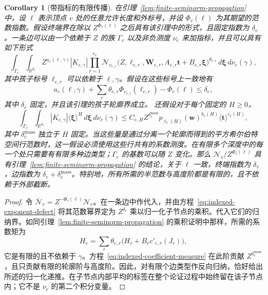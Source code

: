 \documentclass[11pt,a4paper]{article}
\numberwithin{equation}{section}
\numberwithin{figure}{section}
\newtheorem{corollary}[theorem]{Corollary}
\theoremstyle{definition}
\theoremstyle{remark}
\begin{document}
\begin{corollary}[带指标的有限传播]
\label{cor:indexed-seminorm-propagation}
在引理~\ref{lem:finite-seminorm-propagation} 中，设
$\boldsymbol\ell$ 表示顶点 $v$ 处的任意允许长度和外标号，并设 $\Phi_v(\boldsymbol\ell)$ 为其期望的范数指数。假设终端界在除以 $Z^{\Phi_v(\boldsymbol\ell)}$ 之后具有该引理中的形式，且固定指数为 $\delta_v$。一条边可以由一个依赖于 $Z$ 的族 $\Gamma_e$ 以及非负测度 $\nu_e$ 来加指标，并且可以具有如下形式
\[
 \int_{\Gamma_e}\int_{\mathbb R^{d_e}}
 Z^{a_e(\boldsymbol\ell,\gamma)}|K_{e,\gamma}|
 \prod_{r=1}^{r_e}\mathcal N_{v_{e,r}}
  \bigl(Z,\boldsymbol\ell_{e,r},\boldsymbol W_{e,r},
        A_{e,r}\boldsymbol t+B_{e,r}\boldsymbol\xi\bigr)^{\theta_{e,r}}
 \,d\boldsymbol\xi\,d\nu_e(\gamma),
\]
其中孩子标号 $\boldsymbol\ell_{e,r}$ 可以依赖于
$\boldsymbol\ell,\gamma$。假设在这些标号上一致地有
\begin{equation}\label{eq:indexed-exponent-defect}
 a_e(\boldsymbol\ell,\gamma)
   +\sum_r\theta_{e,r}\Phi_{v_{e,r}}(\boldsymbol\ell_{e,r})
   -\Phi_v(\boldsymbol\ell)\le\delta_e,
\end{equation}
其中 $\delta_e$ 固定，并且该引理的孩子轮廓界成立。
还假设对于每个固定的 $H\ge0$，
\begin{equation}\label{eq:indexed-coefficient-measure}
 \int_{\Gamma_e}\int_{\mathbb R^{d_e}}|K_{e,\gamma}|
       \langle\boldsymbol\xi\rangle^H\,d\boldsymbol\xi\,d\nu_e(\gamma)
 \le C_{e,H}Z^{\delta_e^{\mathrm{mass}}}
       p_{\ell_e(H)}(\boldsymbol w)^{b_e(H)}
       \langle\boldsymbol t\rangle^{c_e(H)},
\end{equation}
其中 $\delta_e^{\mathrm{mass}}$ 独立于 $H$ 固定。当这些量是通过分离一个轮廓而得到的平方希尔伯特空间行范数时，这一假设必须使用这些行共有的系数测度。在有限多个深度中的每一个处只需要有有限多种边类型；$\Gamma_e$ 的基数可以随 $Z$ 变化。那么 $\mathcal N_v/Z^{\Phi_v(\boldsymbol\ell)}$ 具有引理~\ref{lem:finite-seminorm-propagation} 的结论，关于 $\boldsymbol\ell$ 一致，终端指数为 $\delta_v$，边指数为 $\delta_e+\delta_e^{\mathrm{mass}}$。特别地，所有所需的半范数与高度阶都是有限的，且不依赖于外部截断。
\end{corollary}

\begin{proof}
令 $\overline{\mathcal N}_v=Z^{-\Phi_v(\boldsymbol\ell)}\mathcal N_v$。在一条边中作代入，并由方程~\eqref{eq:indexed-exponent-defect} 将其范数幂界定为 $Z^{\delta_e}$ 乘以归一化子节点的乘积。代入它们的归纳界。如同引理~\ref{lem:finite-seminorm-propagation} 的乘积证明中那样，所需的系数矩为
\[
 H_e=\sum_r\theta_{e,r}
              \bigl(H_r+B_r c'_{e,r}(J_r)\bigr),
\]
它是有限的且不依赖于 $\gamma$。方程~\eqref{eq:indexed-coefficient-measure} 在此阶贡献 $Z^{\delta_e^{\mathrm{mass}}}$，且只贡献有限的轮廓阶与高度阶。因此，对有限个边类型作反向归纳，恰好给出所述的归一化递推。在子节点内部平均的标签在整个论证过程中始终留在该子节点内；它不是 $\nu_e$ 的第二个积分变量。
\end{proof}
\end{document}
